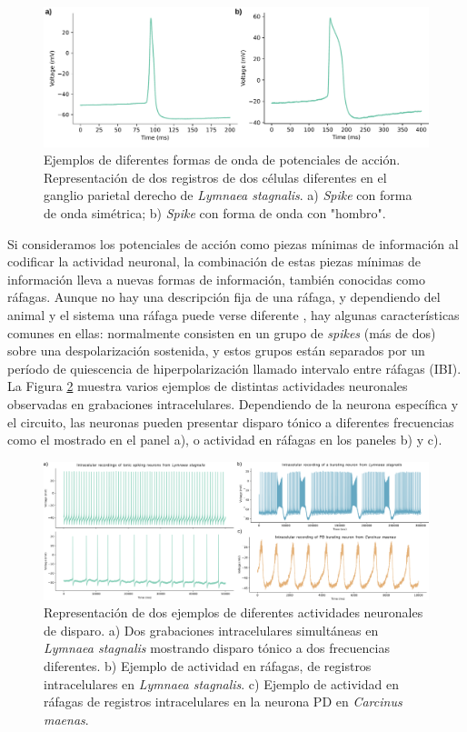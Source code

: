 \begin{figure}[htb!]
	\centering
	\includegraphics[width=\linewidth]{img/intro/spike-types.pdf}
	\caption{Ejemplos de diferentes formas de onda de potenciales de acción. Representación de dos registros de dos células diferentes en el ganglio parietal derecho de \textit{Lymnaea stagnalis}. a) \textit{Spike} con forma de onda simétrica; b) \textit{Spike} con forma de onda con "hombro".}
	\label{fig:spike-types spanish}
\end{figure}

Si consideramos los potenciales de acción como piezas mínimas de información al codificar la actividad neuronal, la combinación de estas piezas mínimas de información lleva a nuevas formas de información, también conocidas como ráfagas. Aunque no hay una descripción fija de una ráfaga, y dependiendo del animal y el sistema una ráfaga puede verse diferente \parencite{russell_bursting_1978,palmu_detection_2010,lundqvist_gamma_2016}, hay algunas características comunes en ellas: normalmente consisten en un grupo de \textit{spikes} (más de dos) sobre una despolarización sostenida, y estos grupos están separados por un período de quiescencia de hiperpolarización llamado intervalo entre ráfagas (IBI). La Figura \ref{fig:spike_activity-types spanish} muestra varios ejemplos de distintas actividades neuronales observadas en grabaciones intracelulares. Dependiendo de la neurona específica y el circuito, las neuronas pueden presentar disparo tónico a diferentes frecuencias como el mostrado en el panel a), o actividad en ráfagas en los paneles b) y c).

\begin{figure}[htb!]
	\centering
	\includegraphics[width=\linewidth]{img/intro/spike_activity-types.png}
	\caption{Representación de dos ejemplos de diferentes actividades neuronales de disparo. a) Dos grabaciones intracelulares simultáneas en \textit{Lymnaea stagnalis} mostrando disparo tónico a dos frecuencias diferentes. b) Ejemplo de actividad en ráfagas, de registros intracelulares en \textit{Lymnaea stagnalis}. c) Ejemplo de actividad en ráfagas de registros intracelulares en la neurona PD en \textit{Carcinus maenas}.}
	\label{fig:spike_activity-types spanish}
\end{figure}

